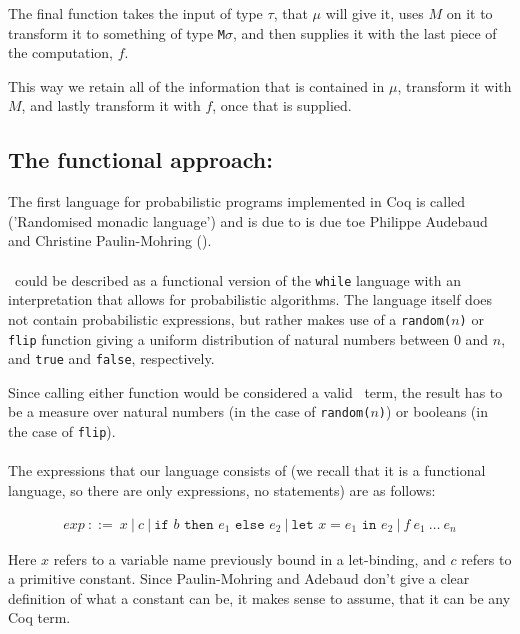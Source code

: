 \documentclass[11pt, leqno, titlepage]{article}
\theoremstyle{definition}
\begin{document}
The final function takes the input of type $\tau$, that $\mu$ will give it,
uses $M$ on it to transform it to something of type \texttt{M}$\sigma$, and then
supplies it with the last piece of the computation, $f$.

This way we retain all of the information that is contained in $\mu$, transform it
with $M$, and lastly transform it with $f$, once that is supplied.



\subsection{The functional approach: \rml}\label{sec:rml}
The first language for probabilistic programs implemented in Coq is called \rml
('Randomised monadic language')
and is due to is due toe Philippe Audebaud and Christine Paulin-Mohring
(\cite{rml-paper}). 
\\ \\
\rml\ could be described as a functional version of the \texttt{while} language with
an interpretation that allows for probabilistic algorithms. The language itself does
not contain probabilistic expressions, but rather makes use of a \texttt{random($n$)}
or \texttt{flip} function giving a uniform distribution of natural numbers between 0
and $n$, and \texttt{true} and \texttt{false}, respectively.

Since calling either function would be considered a valid \rml\ term, the result has
to be a measure over natural numbers (in the case of \texttt{random($n$)}) or
booleans (in the case of \texttt{flip}).\\
\\
The expressions that our language consists of (we
recall that it is a functional language, so there are only expressions, no
statements) are as follows:

\begin{align*}
  exp~::= ~ x~\vert ~ c~\vert ~ \texttt{if }b\texttt{ then }e_1\texttt{ else } e_2~
  \vert ~ \texttt{let }x = e_1 \texttt{ in }e_2~\vert ~ f~e_1~\dots~e_n
\end{align*}

Here $x$ refers to a variable name previously bound in a let-binding, and $c$ refers
to a primitive constant. Since Paulin-Mohring and Adebaud don't give a clear
definition of what a constant can be, it makes sense to assume, that it can be any
Coq term.
\end{document}
